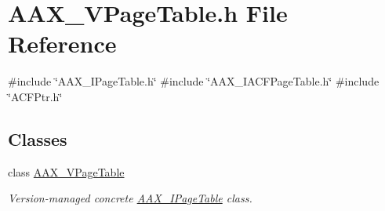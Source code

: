 \hypertarget{a00719}{}\section{A\+A\+X\+\_\+\+V\+Page\+Table.\+h File Reference}
\label{a00719}
{\ttfamily \#include \char`\"{}A\+A\+X\+\_\+\+I\+Page\+Table.\+h\char`\"{}}\newline
{\ttfamily \#include \char`\"{}A\+A\+X\+\_\+\+I\+A\+C\+F\+Page\+Table.\+h\char`\"{}}\newline
{\ttfamily \#include \char`\"{}A\+C\+F\+Ptr.\+h\char`\"{}}\newline
\subsection*{Classes}
\begin{DoxyCompactItemize}
\item 
class \mbox{\hyperlink{a01929}{A\+A\+X\+\_\+\+V\+Page\+Table}}
\begin{DoxyCompactList}\small\item\em Version-\/managed concrete \mbox{\hyperlink{a01849}{A\+A\+X\+\_\+\+I\+Page\+Table}} class. \end{DoxyCompactList}\end{DoxyCompactItemize}

